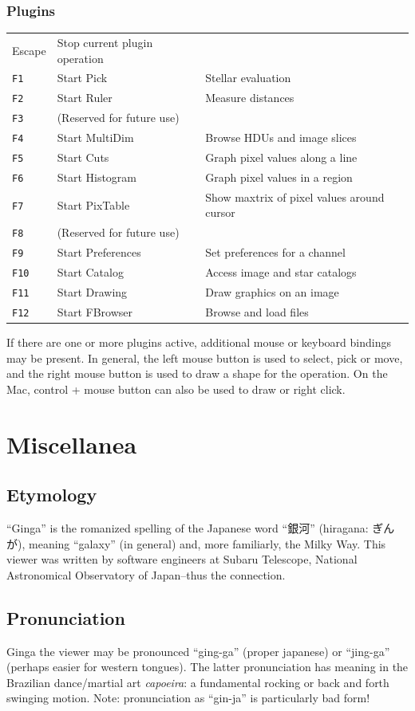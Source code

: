 \documentclass[11pt]{report}
\begin{document}
\subsection{Plugins}
\begin{tabularx}{\textwidth}{llX}
Escape & Stop current plugin operation & \\
{\tt F1} & Start Pick & Stellar evaluation \\
{\tt F2} & Start Ruler & Measure distances \\
{\tt F3} & (Reserved for future use) & \\
{\tt F4} & Start MultiDim & Browse HDUs and image slices \\
{\tt F5} & Start Cuts & Graph pixel values along a line \\
{\tt F6} & Start Histogram & Graph pixel values in a region \\
{\tt F7} & Start PixTable & Show maxtrix of pixel values around cursor \\
{\tt F8} & (Reserved for future use) & \\
{\tt F9} & Start Preferences & Set preferences for a channel \\
{\tt F10} & Start Catalog & Access image and star catalogs \\
{\tt F11} & Start Drawing & Draw graphics on an image \\
{\tt F12} & Start FBrowser & Browse and load files \\
\end{tabularx}

If there are one or more plugins active, additional mouse or keyboard
bindings may be present.  In general, the left mouse button is used to
select, pick or move, and the right mouse button is used to draw a
shape for the operation.  
On the Mac, control + mouse button can also be used to draw or right click.

\chapter{Miscellanea}
\section{Etymology}
``Ginga'' is the romanized spelling of the Japanese word ``銀河''
(hiragana: ぎんが), meaning ``galaxy'' (in general) and, more familiarly,
the Milky Way.  This viewer was written by software engineers at Subaru
Telescope, National Astronomical Observatory of Japan--thus the
connection. 

\section{Pronunciation}
Ginga the viewer may be pronounced ``ging-ga'' (proper japanese) or
``jing-ga'' (perhaps easier for western tongues).  The latter
pronunciation has meaning in the Brazilian dance/martial art
\emph{capoeira}: a fundamental rocking or back and forth swinging
motion.
Note: pronunciation as ``gin-ja'' is particularly bad form!
\end{document}
